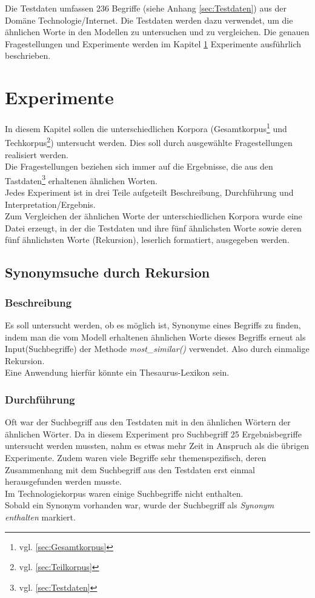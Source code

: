 \documentclass[12pt,a4paper]{report}
\begin{document}
	Die Testdaten umfassen 236 Begriffe (siehe Anhang \ref{sec:Testdaten}) aus der Domäne Technologie/Internet. Die Testdaten werden dazu verwendet, um die ähnlichen Worte in den Modellen zu untersuchen und zu vergleichen. Die genauen Fragestellungen und Experimente werden im Kapitel \ref{chap:Experimente} Experimente ausführlich beschrieben.
	
	
\newpage
\chapter{Experimente}
\label{chap:Experimente}
In diesem Kapitel sollen die unterschiedlichen Korpora (Gesamtkorpus\footnote{vgl. \ref{sec:Gesamtkorpus}} und Techkorpus\footnote{vgl. \ref{sec:Teilkorpus}}) untersucht werden. Dies soll durch ausgewählte Fragestellungen realisiert werden.
\\Die Fragestellungen beziehen sich immer auf die Ergebnisse, die aus den Tastdaten\footnote{vgl. \ref{sec:Testdaten}} erhaltenen ähnlichen Worten.
\\Jedes Experiment ist in drei Teile aufgeteilt Beschreibung, Durchführung und Interpretation/Ergebnis.\\
Zum Vergleichen der ähnlichen Worte der unterschiedlichen Korpora wurde eine Datei erzeugt, in der die Testdaten und ihre fünf ähnlichsten Worte sowie deren fünf ähnlichsten Worte (Rekursion), leserlich formatiert, ausgegeben werden.\\ 

	\section{Synonymsuche durch Rekursion}
\label{chap:Experiment1}
		\subsection{Beschreibung}
		Es soll untersucht werden, ob es möglich ist, Synonyme eines Begriffs zu finden, indem man die vom Modell erhaltenen ähnlichen Worte dieses Begriffs erneut als Input(Suchbegriffe) der Methode  \textit{most\_similar()} verwendet. Also durch einmalige Rekursion.\\
Eine Anwendung hierfür könnte ein Thesaurus-Lexikon sein.

		
		
		\subsection{Durchführung}
		Oft war der Suchbegriff aus den Testdaten mit in den ähnlichen Wörtern der ähnlichen Wörter. Da in diesem Experiment pro Suchbegriff 25 Ergebnisbegriffe untersucht werden mussten, nahm es etwas mehr Zeit in Anspruch als die übrigen Experimente. Zudem waren viele Begriffe sehr themenspezifisch, deren Zusammenhang mit dem Suchbegriff aus den Testdaten erst einmal herausgefunden werden musste.\\
		Im Technologiekorpus waren einige Suchbegriffe nicht enthalten.\\
		Sobald ein Synonym vorhanden war, wurde der Suchbegriff als \textit{Synonym enthalten} markiert.
	
\end{document}

